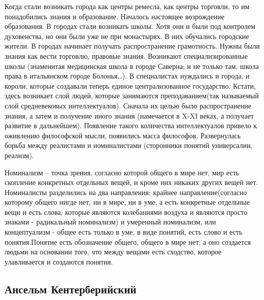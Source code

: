 Когда стали возникать города как центры ремесла, как центры торговли, то им понадобились знания и образование. Началось настоящее возрождение образования. В городах стали возникать школы. Хотя они и были под контролем духовенства, но они были уже не при монастырях. В них обучались городские жители. В городах начинает получать распространение грамотность. Нужны были знания как вести торговлю, правовые знания. Возникают специализированные школы (знаменитая медицинская школа в городе Саверна; и не только там, школа права в итальянском городе Болонья…). В специалистах нуждались и города, и короли, которые создавали теперь единое централизованное государство. Кстати, здесь возникает слой людей, которые занимаются преподаванием(так называемый слой средневековых интеллектуалов). Сначала их целью было распространение знания, а затем и получение иного знания (намечается в X-XI веках, а получает развитие в дальнейшем). Появление такого количества интеллектуалов привело к оживлению философской мысли, появились масса философов. Развернулась борьба между реалистами и номиналистами (сторонники понятий универсалии, реализм).

    Номинализм – точка зрения, согласно которой общего в мире нет, мир есть скопление конкретных отдельных вещей, и кроме них никаких других вещей нет. Номиналисты разделились на два направления: крайнее направление(согласно которому общего нигде нет, ни в мире, ни в уме, а есть конкретные отдельные вещи и есть слова, которые являются колебаниями воздуха и являются просто знаками - радикальный номинализм) и умеренный номинализм, или концептуализм - общее есть только в уме, в виде понятий, есть слово и есть понятия.Понятие есть обозначение общего, общего в мире нет, а оно создается людьми на основании того, что между вещами есть сходство, которое улавливается и создаются понятия.

\subsection{Ансельм Кентерберийский}

